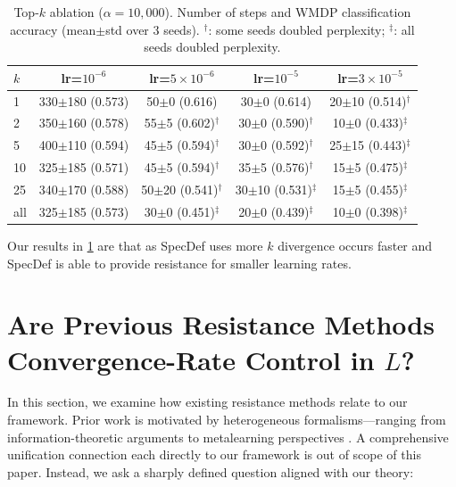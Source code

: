 \documentclass{article}
\theoremstyle{plain}
\theoremstyle{definition}
\theoremstyle{remark}
\begin{document}
\begin{table}[h]
\centering
\small
\begin{tabular}{lcccc}
\toprule
$k$ & lr=$10^{-6}$ & lr=$5{\times}10^{-6}$ & lr=$10^{-5}$ & lr=$3{\times}10^{-5}$ \\
\midrule
1 & 330$\pm$180 (0.573) & 50$\pm$0 (0.616) & 30$\pm$0 (0.614) & 20$\pm$10 (0.514)$^\dagger$ \\
2 & 350$\pm$160 (0.578) & 55$\pm$5 (0.602)$^\dagger$ & 30$\pm$0 (0.590)$^\dagger$ & 10$\pm$0 (0.433)$^\ddagger$ \\
5 & 400$\pm$110 (0.594) & 45$\pm$5 (0.594)$^\dagger$ & 30$\pm$0 (0.592)$^\dagger$ & 25$\pm$15 (0.443)$^\ddagger$ \\
10 & 325$\pm$185 (0.571) & 45$\pm$5 (0.594)$^\dagger$ & 35$\pm$5 (0.576)$^\dagger$ & 15$\pm$5 (0.475)$^\ddagger$ \\
25 & 340$\pm$170 (0.588) & 50$\pm$20 (0.541)$^\dagger$ & 30$\pm$10 (0.531)$^\ddagger$ & 15$\pm$5 (0.455)$^\ddagger$ \\
all & 325$\pm$185 (0.573) & 30$\pm$0 (0.451)$^\ddagger$ & 20$\pm$0 (0.439)$^\ddagger$ & 10$\pm$0 (0.398)$^\ddagger$ \\
\bottomrule
\end{tabular}
\label{tab:topk-ablation}
\caption{Top-$k$ ablation ($\alpha=10,000$). Number of steps and WMDP classification accuracy (mean$\pm$std over 3 seeds). $^\dagger$: some seeds doubled perplexity; $^\ddagger$: all seeds doubled perplexity.}
\end{table}

Our results in \cref{tab:topk-ablation} are that as SpecDef uses more $k$ divergence occurs faster and SpecDef is able to provide resistance for smaller learning rates.

\section{Are Previous Resistance Methods Convergence-Rate Control in $L$?}
\label{app:previous-defence-analysis}

In this section, we examine how existing resistance methods relate to our framework. Prior work is motivated by heterogeneous formalisms—ranging from information-theoretic arguments \citep{rosati-etal-2024-immunization} to metalearning perspectives \citep{tamirisa2025tamperresistantsafeguardsopenweightllms}. A comprehensive unification connection each directly to our framework is out of scope of this paper. Instead, we ask a sharply defined question aligned with our theory:
\end{document}
